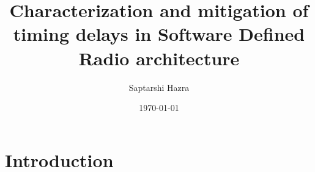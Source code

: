 \documentclass{kththesis}
\title{Characterization and mitigation of timing delays in Software Defined Radio architecture}
\author{Saptarshi Hazra}
\date{\today}
\begin{document}
\frontmatter

\titlepage





\tableofcontents


\mainmatter


\chapter{Introduction}
\end{document}
